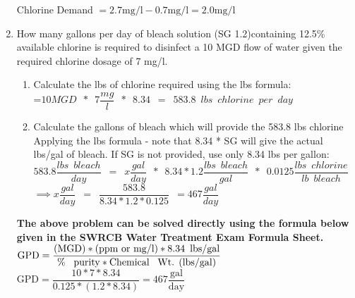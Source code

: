 \begin{enumerate}[1.]
Chlorine Demand $=2.7 \mathrm{mg} / \mathrm{l}-0.7 \mathrm{mg} / \mathrm{l} =\boxed{2.0 \mathrm{mg} / \mathrm{l}}$\\
\vspace{0.2cm}
\item How many gallons per day of bleach solution (SG 1.2)containing 12.5\% available chlorine is required to disinfect a 10 MGD flow of water given the required chlorine dosage of 7 mg/l.\\
\begin{enumerate}
\item Calculate the lbs of chlorine required using the lbs formula:\\
\vspace{0.5cm}
=$10 MGD \enspace * \enspace 7 \dfrac{mg}{l} \enspace * \enspace 8.34\enspace=\enspace 583.8 \enspace lbs \enspace chlorine \enspace per \enspace day$\\
\vspace{0.5cm}
\item Calculate the gallons of bleach which will provide the 583.8 lbs chlorine\\
\vspace{0.5cm}
Applying the lbs formula - note that 8.34 * SG will give the actual lbs/gal of bleach.  If SG is not provided, use only 8.34 lbs per gallon:\\
\vspace{0.5cm}
$583.8 \dfrac{lbs \enspace bleach}{day}\enspace=\enspace x \dfrac{gal}{day} \enspace * \enspace 8.34 * 1.2 \dfrac{lbs \enspace bleach}{gal} \enspace * \enspace 0.0125 \dfrac{lbs \enspace chlorine}{lb \enspace bleach} \enspace $\\
\vspace{0.5cm}
$ \implies x \dfrac{gal}{day}\enspace = \enspace \dfrac{583.8}{8.34*1.2*0.125} \enspace = \boxed{467 \dfrac{gal}{day}}$
\end{enumerate}
\vspace{0.3cm}
\textbf{The above problem can be solved directly using the formula below given in the SWRCB Water Treatment Exam Formula Sheet.}\\
\vspace{0.3cm}
 $\textrm{GPD}=\dfrac{\textrm{(MGD)}*\textrm{(ppm or mg/l)}*8.34 \enspace \textrm{lbs/gal}}{\textrm{\% \enspace purity}*\textrm{Chemical \enspace Wt. (lbs/gal)}}$ 
 \vspace{0.3cm}
 $\textrm{GPD}=\dfrac{10*7*8.34}{0.125*(1.2*8.34)}=\boxed{467 \dfrac{\textrm{gal}}{\textrm{day}}}$ 
\end{enumerate}
